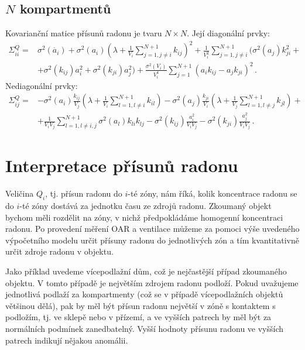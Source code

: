\subsection{$N$ kompartmentů}
Kovarianční matice přísunů radonu je tvaru $N\times N$. Její diagonální prvky:
\begin{align}
    \Sigma_{ii}^Q=&\sigma^2(\dot{a_i}) + \sigma^2(a_i)\left(\lambda + \frac{1}{V_i}\sum_{j=1,j\neq i}^{N+1}k_{ij}\right)^2 + \frac{1}{V_i^2}\sum_{j=1,j\neq i}^{N+1}\big(\sigma^2(a_j)k_{ji}^2 + \nonumber\\
    &+ \sigma^2(k_{ij})a_i^2 + \sigma^2(k_{ji})a_j^2\big) + \frac{\sigma^2(V_i)}{V_i^4}\sum_{j=1}^{N+1}\left(a_i k_{ij} -a_j k_{ji}\right)^2\,.
    \label{eq:nejistota_Nzon}
\end{align}
Nediagonální prvky:
\begin{align}
    \Sigma_{ij}^Q=&-\sigma^2(a_i)\frac{k_{ij}}{V_j}\left(\lambda + \frac{1}{V_i}\sum_{l=1,l\neq i}^{N+1}k_{il}\right) - \sigma^2(a_j)\frac{k_{ji}}{V_i}\left(\lambda + \frac{1}{V_j}\sum_{l=1,l\neq j}^{N+1}k_{jl}\right)+\nonumber\\
    &+ \frac{1}{V_iV_j}\sum_{l=1,l\neq i,j}^{N+1}\sigma^2(a_l)k_{li}k_{lj} - \sigma^2(k_{ij})\frac{a_i^2}{V_iV_j} - \sigma^2(k_{ji})\frac{a_j^2}{V_iV_j}\,.
\end{align}

\section{Interpretace přísunů radonu}\label{navesti:model_interpretace_Q}
Veličina $Q_i$, tj. přísun radonu do $i$-té zóny, nám říká, kolik koncentrace radonu se do $i$-té zóny dostává za jednotku času ze zdrojů radonu. Zkoumaný objekt bychom měli rozdělit na zóny, v nichž předpokládáme homogenní koncentraci radonu. Po provedení měření OAR a ventilace můžeme za pomoci výše uvedeného výpočetního modelu určit přísuny radonu do jednotlivých zón a tím kvantitativně určit zdroje radonu v objektu.

Jako příklad uvedeme vícepodlažní dům, což je nejčastější případ zkoumaného objektu. V tomto případě je největším zdrojem radonu podloží. Pokud uvažujeme jednotlivá podlaží za kompartmenty (což se v případě vícepodlažních objektů většinou dělá), pak by měl být přísun radonu největší v zóně s kontaktem s podložím, tj. ve sklepě nebo v přízemí, a ve vyšších patrech by měl být za normálních podmínek zanedbatelný. Vyšší hodnoty přísunu radonu ve vyšších patrech indikují nějakou anomálii.


